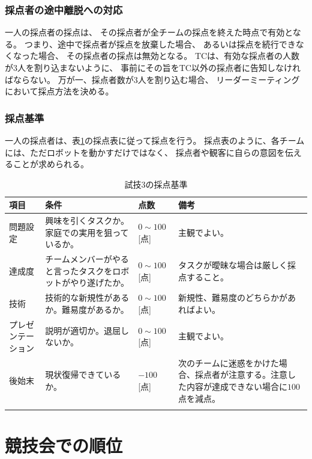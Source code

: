 \documentclass[a4j]{jarticle}
\def\thline{\noalign{\hrule height 1pt}}
\begin{document}
\subsubsection{採点者の途中離脱への対応}

一人の採点者の採点は、
その採点者が全チームの採点を終えた時点で有効となる。
つまり、途中で採点者が採点を放棄した場合、
あるいは採点を続行できなくなった場合、
その採点者の採点は無効となる。
TCは、有効な採点者の人数が$3$人を割り込まないように、
事前にその旨をTC以外の採点者に告知しなければならない。
万が一、採点者数が$3$人を割り込む場合、
リーダーミーティングにおいて採点方法を決める。

\subsubsection{採点基準}

一人の採点者は、表\ref{table:test3score}の採点表に従って採点を行う。
採点表のように、各チームには、ただロボットを動かすだけではなく、
採点者や観客に自らの意図を伝えることが求められる。


\begin{table}
\begin{center}
\caption{試技3の採点基準}
\label{table:test3score}
\begin{tabular}{l|p{4cm}|l|p{4cm}}
\thline
項目 & 条件 & 点数 & 備考\\
\hline
問題設定 & 興味を引くタスクか。家庭での実用を狙っているか。 & $0\sim100$[点] & 主観でよい。\\
\hline
達成度 & チームメンバーがやると言ったタスクをロボットがやり遂げたか。 & $0\sim100$[点] & タスクが曖昧な場合は厳しく採点すること。 \\
\hline
技術 & 技術的な新規性があるか。難易度があるか。 & $0\sim100$[点]  & 新規性、難易度のどちらかがあればよい。\\
\hline
プレゼンテーション & 説明が適切か。退屈しないか。 & $0\sim100$[点] & 主観でよい。\\
\hline
後始末 & 現状復帰できているか。 & $-100$[点] & 次のチームに迷惑をかけた場合、採点者が注意する。注意した内容が達成できない場合に$100$点を減点。\\
\thline
\end{tabular}
\end{center}
\end{table}



\section{競技会での順位}
\end{document}
